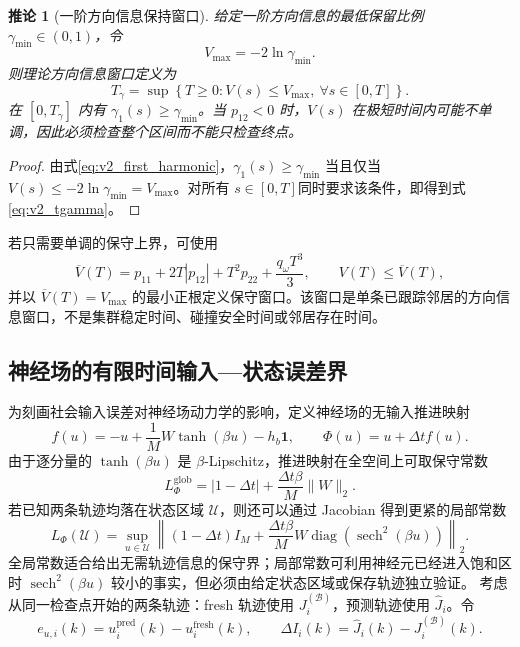 \documentclass[UTF8,fontset=windows,11pt]{ctexart}
\theoremstyle{cnplain}
\newtheorem{corollary}[theorem]{推论}
\numberwithin{equation}{section}
\begin{document}
\begin{corollary}[一阶方向信息保持窗口]
\label{cor:v2_direction_window}
给定一阶方向信息的最低保留比例 $\gamma_{\min}\in(0,1)$，令
\begin{equation}
 V_{\max}=-2\ln\gamma_{\min}.
 \label{eq:v2_vmax}
\end{equation}
则理论方向信息窗口定义为
\begin{equation}
 T_\gamma=\sup\left\{T\ge0:
 V(s)\le V_{\max},\ \forall s\in[0,T]\right\}.
 \label{eq:v2_tgamma}
\end{equation}
在 $[0,T_\gamma]$ 内有 $\gamma_1(s)\ge\gamma_{\min}$。当 $p_{12}<0$ 时，$V(s)$ 在极短时间内可能不单调，因此必须检查整个区间而不能只检查终点。
\end{corollary}

\begin{proof}
由式\eqref{eq:v2_first_harmonic}，$\gamma_1(s)\ge\gamma_{\min}$ 当且仅当 $V(s)\le-2\ln\gamma_{\min}=V_{\max}$。对所有 $s\in[0,T]$同时要求该条件，即得到式\eqref{eq:v2_tgamma}。
\end{proof}

若只需要单调的保守上界，可使用
\begin{equation}
 \overline V(T)=p_{11}+2T|p_{12}|+T^2p_{22}+\frac{q_\omega T^3}{3},
 \qquad V(T)\le\overline V(T),
 \label{eq:v2_vupper}
\end{equation}
并以 $\overline V(T)=V_{\max}$ 的最小正根定义保守窗口。该窗口是单条已跟踪邻居的方向信息窗口，不是集群稳定时间、碰撞安全时间或邻居存在时间。

\subsection{神经场的有限时间输入—状态误差界}

为刻画社会输入误差对神经场动力学的影响，定义神经场的无输入推进映射
\begin{equation}
 f(u)=-u+\frac{1}{M}W\tanh(\beta u)-h_b\bm 1,
 \qquad
 \Phi(u)=u+\Delta t f(u).
 \label{eq:v2_field_map}
\end{equation}
由于逐分量的 $\tanh(\beta u)$ 是 $\beta$-Lipschitz，推进映射在全空间上可取保守常数
\begin{equation}
 L_\Phi^{\mathrm{glob}}
 =|1-\Delta t|+\frac{\Delta t\beta}{M}\|W\|_2.
 \label{eq:v2_global_lipschitz}
\end{equation}
若已知两条轨迹均落在状态区域 $\mathcal U$，则还可以通过 Jacobian 得到更紧的局部常数
\begin{equation}
 L_\Phi(\mathcal U)=
 \sup_{u\in\mathcal U}
 \left\|(1-\Delta t)I_M+
 \frac{\Delta t\beta}{M}W
 \operatorname{diag}\!\left(\operatorname{sech}^2(\beta u)\right)
 \right\|_2.
 \label{eq:v2_local_lipschitz}
\end{equation}
全局常数适合给出无需轨迹信息的保守界；局部常数可利用神经元已经进入饱和区时 $\operatorname{sech}^2(\beta u)$ 较小的事实，但必须由给定状态区域或保存轨迹独立验证。
考虑从同一检查点开始的两条轨迹：fresh 轨迹使用 $J_i^{(\mathcal B)}$，预测轨迹使用 $\widehat J_i$。令
\begin{equation}
 e_{u,i}(k)=u_i^{\mathrm{pred}}(k)-u_i^{\mathrm{fresh}}(k),
 \qquad
 \Delta I_i(k)=\widehat J_i(k)-J_i^{(\mathcal B)}(k).
 \label{eq:v2_state_error}
\end{equation}
\end{document}
